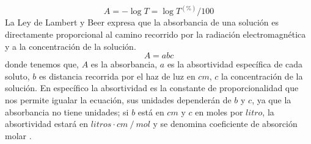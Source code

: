 \begin{equation}
    A=-\log T = \log T^{(\%)}/100
\end{equation}
La Ley de Lambert y Beer expresa que la absorbancia de una solución es directamente proporcional al camino recorrido por la radiación electromagnética y a la concentración de la
solución. 
\begin{equation}
    A = abc
    \label{ley}
\end{equation}
donde tenemos que, $A$ es la absorbancia, $a$ es la absortividad específica de cada soluto, $b$ es distancia recorrida por el haz de luz en $cm$, $c$ la concentración de la solución. En específico la absortividad es la constante de proporcionalidad que nos permite igualar la ecuación, sus unidades dependerán de $b$ y $c$, ya que la absorbancia no tiene unidades; si $b$ está en $cm$ y $c$ en moles por $litro$, la absortividad estará en $litros\cdot cm~/~ mol $ 
y se denomina coeficiente de absorción molar .

